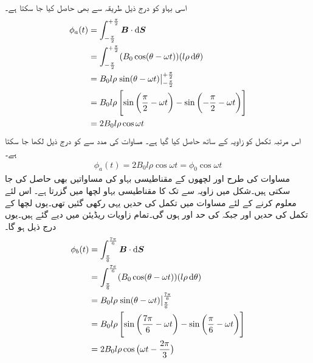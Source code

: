 اسی بہاو کو درج ذیل طریقہ سے بھی حاصل کیا جا سکتا ہے۔
\begin{gather}
\begin{aligned}\label{مساوات_گھومتے_مشین_قطبی_بہاو_بالمقابل_وقت}
\phi_a(t)&=\int_{-\frac{\pi}{2}}^{+\frac{\pi}{2}} \kvec{B} \cdot \dif \kvec{S}\\
&=\int_{-\frac{\pi}{2}}^{+\frac{\pi}{2}} (B_0 \cos (\theta-\omega t))(l \rho \dif \theta)\\
&=B_0 l \rho \left. \sin (\theta-\omega t) \right\vert_{-\frac{\pi}{2}}^{+\frac{\pi}{2}}\\
&=B_0 l \rho \left[\sin \left(\frac{\pi}{2}-\omega t \right )-\sin \left (-\frac{\pi}{2}-\omega t \right) \right]\\
&=2 B_0 l \rho \cos \omega t
\end{aligned}
\end{gather}
اس مرتبہ تکمل کو زاویہ  کے ساتھ حاصل کیا گیا ہے۔ مساوات   کی مدد سے   کو درج ذیل لکھا جا سکتا ہے۔
\begin{align}
\phi_a(t)=2 B_0 l \rho \cos \omega t=\phi_0 \cos \omega t
\end{align}
مساوات   کی طرح    اور  لچھوں کے  مقناطیسی بہاو کی مساواتیں بھی حاصل کی جا سکتی ہیں۔شکل   میں زاویہ  سے   تک کا مقناطیسی بہاو لچھا   میں  گزرتا ہے۔ اس لئے   معلوم کرنے کے لئے مساوات   میں تکمل کی حدیں یہی رکھی گئیں تھی۔یوں لچھا   کے تکمل کی حدیں    اور  جبکہ  کی حد  اور  ہوں گی۔تمام زاویات ریڈیئن میں دیے گئے ہیں۔یوں درج ذیل ہو گا۔
\begin{gather}
\begin{aligned}
\phi_b(t)&=\int_{\frac{\pi}{6}}^{\frac{7\pi}{6}} \kvec{B} \cdot \dif \kvec{S}\\
&=\int_{\frac{\pi}{6}}^{\frac{7\pi}{6}} (B_0 \cos (\theta-\omega t))(l \rho \dif \theta)\\
&=B_0 l \rho \left. \sin (\theta-\omega t) \right\vert_{\frac{\pi}{6}}^{\frac{7\pi}{6}}\\
&=B_0 l \rho \left[\sin \left(\frac{7\pi}{6}-\omega t \right )-\sin \left (\frac{\pi}{6}-\omega t \right) \right]\\
&=2 B_0 l \rho \cos \big(\omega t-\frac{2\pi}{3}\big)
\end{aligned}
\end{gather}
